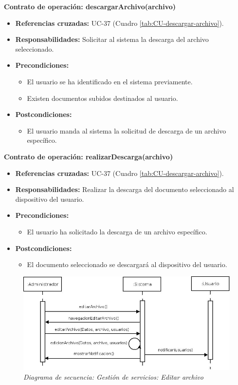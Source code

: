 \textbf{Contrato de operación: descargarArchivo(archivo)}
\begin{itemize}
\item \textbf{Referencias cruzadas:} UC-37 (Cuadro \ref{tab:CU-descargar-archivo}).
\item \textbf{Responsabilidades:} Solicitar al sistema la descarga del archivo seleccionado.
\item \textbf{Precondiciones:} 
 \begin{itemize}
\item El usuario se ha identificado en el sistema previamente.
\item Existen documentos subidos destinados al usuario.
\end {itemize}
\item \textbf{Postcondiciones:} 
 \begin{itemize}
\item El usuario manda al sistema la solicitud de descarga de un archivo específico.
\end {itemize}
\end {itemize}

\textbf{Contrato de operación: realizarDescarga(archivo)}
\begin{itemize}
\item \textbf{Referencias cruzadas:} UC-37 (Cuadro \ref{tab:CU-descargar-archivo}).
\item \textbf{Responsabilidades:} Realizar la descarga del documento seleccionado al dispositivo del usuario.
\item \textbf{Precondiciones:} 
 \begin{itemize}
\item El usuario ha solicitado la descarga de un archivo específico.
\end {itemize}
\item \textbf{Postcondiciones:} 
 \begin{itemize}
\item El documento seleccionado se descargará al dispositivo del usuario.
\end {itemize}
\end {itemize}


\vspace{10mm}

\begin{figure}
\centering
  \includegraphics[scale=.50]{img/secuencias/gestion-servicios-editar-archivo.jpeg}
  \caption{\textit{Diagrama de secuencia: Gestión de servicios: Editar archivo}}
  \label{fig:secuencia-gestion-servicios-editar-archivo}
\end{figure}

